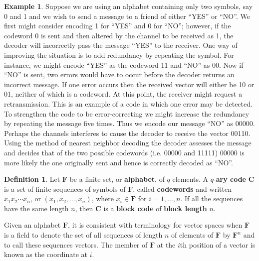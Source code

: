 \documentclass[conference]{IEEEtran}
\theoremstyle{definition}
\newtheorem{definition}[thm]{Definition}
\newtheorem{example}[thm]{Example}
\newtheorem{assumption}[thm]{Assumption}
\begin{document}
\begin{example}
\label{YES_or_NO}
Suppose we are using an alphabet containing only two symbols,
say 0 and 1 and we wish to send a message to a friend of either
``YES'' or ``NO''.  We first might consider encoding 1 for
``YES'' and 0 for ``NO''; however, if the codeword 0 is sent
and then altered by the channel to be received as 1, the
decoder will incorrectly pass the message ``YES'' to the receiver.
One way of improving the situation is to add redundancy by
repeating the symbol.  For instance, we might encode ``YES''
as the codeword 11 and ``NO'' as 00.  Now if ``NO'' is sent,
two errors would have to occur before the decoder returns
an incorrect message.  If one error occurs then the received
vector will either be 10 or 01, neither of which is a codeword.
At this point, the receiver might request a retransmission.
This is an example of a code in which one error may be detected.
To strengthen the code to be error-correcting we might increase
the redundancy by repeating the message five times.  Thus we
encode our message ``NO'' as 00000.  Perhaps the channels
interferes to cause the decoder to receive the vector 00110.
Using the method of nearest neighbor decoding the decoder
assesses the message and decides that of the two possible
codewords (i.e. 00000 and 11111) 00000 is more likely the
one originally sent and hence is correctly decoded as ``NO''.
\end{example}





\begin{definition}
Let $\mathbf{F}$ be a finite set, or {\bf alphabet}, of $q$
elements.  A $q$-{\bf ary code} $\mathbf{C}$ is a set of
finite sequences of symbols of $\mathbf{F}$, called {\bf codewords}
and written $x_1x_2\cdots x_n$, or $(x_1,x_2,\ldots,x_n)$,
where $x_i\in \mathbf{F}$ for $i = 1,\ldots,n$. If all the
sequences have the same length $n$, then $\mathbf{C}$ is a
{\bf block code} of {\bf block length} $n$.
\end{definition}

Given an alphabet $\mathbf{F}$, it is consistent with
terminology for vector spaces when $\mathbf{F}$ is a
field to denote the set of all sequences of length $n$
of elements of $\mathbf{F}$ by $\mathbf{F}^n$ and to
call these sequences vectors.  The member of $\mathbf{F}$
at the $i$th position of a vector is known as the coordinate
at $i$.
\end{document}
